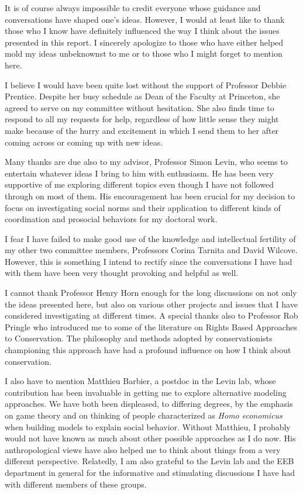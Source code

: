 \documentclass{report}
\begin{document}
It is of course always impossible to credit everyone whose guidance and conversations have shaped one's ideas. However, I would at least like to thank those who I know have definitely influenced the way I think about the issues presented in this report. I sincerely apologize to those who have either helped mold my ideas unbeknownst to me or to those who I might forget to mention here.

I believe I would have been quite lost without the support of Professor Debbie Prentice. Despite her busy schedule as Dean of the Faculty at Princeton, she agreed to serve on my committee without hesitation. She also finds time to respond to all my requests for help, regardless of how little sense they might make because of the hurry and excitement in which I send them to her after coming across or coming up with new ideas.

Many thanks are due also to my advisor, Professor Simon Levin, who seems to entertain whatever ideas I bring to him with enthusiasm. He  has been very supportive of me exploring different topics even though I have not followed through on most of them. His encouragement has been crucial for my decision to focus on investigating social norms and their application to different kinds of coordination and prosocial behaviors for my doctoral work.

I fear I have failed to make good use of the knowledge and intellectual fertility of my other two committee members, Professors Corina Tarnita and David Wilcove. However, this is something I intend to rectify since the conversations I have had with them have been very thought provoking and helpful as well.

I cannot thank Professor Henry Horn enough for the long discussions on not only the ideas presented here, but also on various other projects and issues that I have considered investigating at different times. A special thanks also to Professor Rob Pringle who introduced me to some of the literature on Rights Based Approaches to Conservation. The philosophy and methods adopted by conservationists championing this approach have had a profound influence on how I think about conservation.

I also have to mention Matthieu Barbier, a postdoc in the Levin lab, whose contribution has been invaluable in getting me to explore alternative modeling approaches. We have both been displeased, to differing degrees, by the emphasis on game theory and on thinking of people characterized as \textit{Homo economicus} when building models to explain social behavior. Without Matthieu, I probably would not have known as much about other possible approaches as I do now. His anthropological views have also helped me to think about things from a very different perspective. Relatedly, I am also grateful to the Levin lab and the EEB department in general for the informative and stimulating discussions I have had with different members of these groups.
\end{document}
